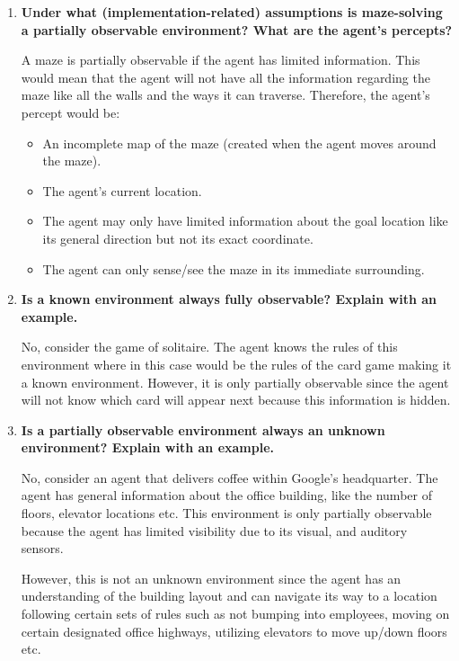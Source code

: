 \documentclass[a4paper]{article}
\begin{document}
\begin{sloppypar}
\begin{enumerate}[start=1,label=Q\arabic*,left=0pt]
    \item \textbf{Under what (implementation-related) assumptions is maze-solving a partially observable environment? What are the agent’s percepts?}
    \par A maze is partially observable if the agent has limited information. This would mean that the agent
    will not have all the information regarding the maze like all the walls and the ways it can traverse. Therefore,
    the agent's percept would be:
    \begin{itemize}
        \item An incomplete map of the maze (created when the agent moves around the maze).
        \item The agent's current location.
        \item The agent may only have limited information about the goal location like its general direction but not its exact coordinate.
        \item The agent can only sense/see the maze in its immediate surrounding.
    \end{itemize}
    
    \item \textbf{Is a known environment always fully observable? Explain with an example.}
    \par No, consider the game of solitaire. The agent knows the rules of this environment where in this case would be the rules
    of the card game making it a known environment. However, it is only partially observable since the agent will not know which card will
    appear next because this information is hidden.
    
    \item \textbf{Is a partially observable environment always an unknown environment? Explain with an example.}
    \par No, consider an agent that delivers coffee within Google's headquarter. The agent has general information about the office building,
    like the number of floors, elevator locations etc. This environment is only partially observable because the agent has limited visibility due to
    its visual, and auditory sensors. 
    
    However, this is not an unknown environment since the agent has an understanding of the building layout and
    can navigate its way to a location following certain sets of rules such as not bumping into employees, moving on certain designated office highways,
    utilizing elevators to move up/down floors etc.


\end{enumerate}
\end{sloppypar}
\end{document}
